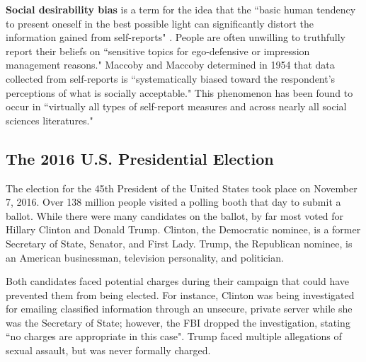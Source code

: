 \textbf{Social desirability bias} is a term for the idea that the ``basic
human tendency to present oneself in the best possible light can significantly
distort the information gained from self-reports"
\citep{maccoby_interview_1954}.
People are often unwilling to truthfully report their beliefs on ``sensitive
topics for ego-defensive or impression management reasons." Maccoby and
Maccoby determined in 1954 that data collected from self-reports is
``systematically biased toward the respondent's perceptions of what is
socially acceptable." This phenomenon has been found to occur in ``virtually
all types of self-report measures and across nearly all social sciences
literatures."


\subsection{The 2016 U.S. Presidential Election}


The election for the 45th President of the United States took place on
November 7, 2016. Over 138 million people visited a polling booth that day to
submit a ballot. While there were many candidates on the ballot, by far most
voted for Hillary Clinton and Donald Trump. Clinton, the Democratic nominee,
is a former Secretary of State, Senator, and First Lady. Trump, the Republican
nominee, is an American businessman, television personality, and politician. 

Both candidates faced potential charges during their campaign that could have
prevented them from being elected. For instance, Clinton was being
investigated for emailing classified information through an unsecure, private
server while she was the Secretary of State; however, the FBI dropped the
investigation, stating ``no charges are appropriate in this case". Trump faced
multiple allegations of sexual assault, but was never formally charged.

